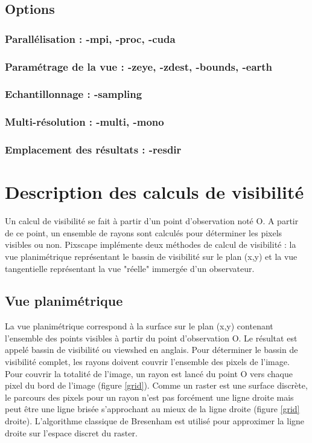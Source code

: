 \documentclass{report}
\begin{document}
\section{Options}

\subsection{Parallélisation : -mpi, -proc, -cuda}

\subsection{Paramétrage de la vue : -zeye, -zdest, -bounds, -earth}

\subsection{Echantillonnage : -sampling}

\subsection{Multi-résolution : -multi, -mono}

\subsection{Emplacement des résultats : -resdir}



\chapter{Description des calculs de visibilité}
\label{principles}
Un calcul de visibilité se fait à partir d'un point d'observation noté O. A partir de ce point, un ensemble de rayons sont calculés pour déterminer les pixels visibles ou non. 
Pixscape implémente deux méthodes de calcul de visibilité : la vue planimétrique représentant le bassin de visibilité sur le plan (x,y) et la vue tangentielle représentant la vue "réelle" immergée d'un observateur.

\section{Vue planimétrique}
La vue planimétrique correspond à la surface sur le plan (x,y) contenant l'ensemble des points visibles à partir du point d'observation O. Le résultat est appelé bassin de visibilité ou viewshed en anglais.
Pour déterminer le bassin de visibilité complet, les rayons doivent couvrir l'ensemble des pixels de l'image.
Pour couvrir la totalité de l'image, un rayon est lancé du point O vers chaque pixel du bord de l'image (figure \ref{grid}). Comme un raster est une surface discrète, le parcours des pixels pour un rayon n'est pas forcément une ligne droite mais peut être une ligne brisée s'approchant au mieux de la ligne droite (figure \ref{grid} droite). L'algorithme classique de Bresenham est utilisé pour approximer la ligne droite sur l'espace discret du raster.
\end{document}
